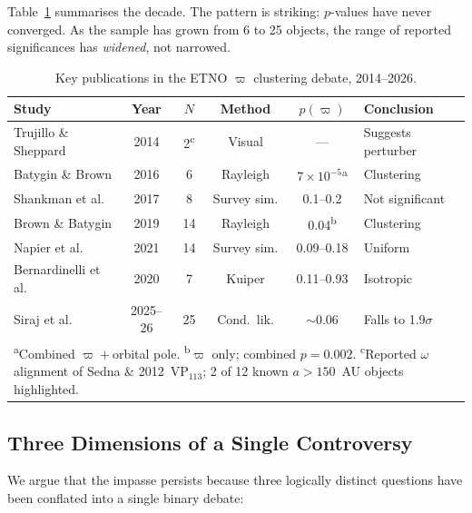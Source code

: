 \documentclass[12pt,a4paper]{article}
\begin{document}
Table~\ref{tab:timeline} summarises the decade. The pattern is striking: $p$-values have never converged. As the sample has grown from 6 to 25 objects, the range of reported significances has \textit{widened}, not narrowed.

\begin{table}[h]
\centering
\caption{Key publications in the ETNO $\varpi$ clustering debate, 2014--2026.}
\label{tab:timeline}
\tiny
\begin{tabular}{p{2.8cm}ccccp{2.8cm}}
\hline
Study & Year & $N$ & Method & $p(\varpi)$ & Conclusion \\
\hline
Trujillo \& Sheppard \cite{trujillo2014} & 2014 & 2\textsuperscript{c} & Visual & --- & Suggests perturber \\
Batygin \& Brown \cite{batygin2016} & 2016 & 6 & Rayleigh & $7{\times}10^{-5}$\textsuperscript{a} & Clustering \\
Shankman et al.\ \cite{shankman2017} & 2017 & 8 & Survey sim. & 0.1--0.2 & Not significant \\
Brown \& Batygin \cite{brown2019} & 2019 & 14 & Rayleigh & 0.04\textsuperscript{b} & Clustering \\
Napier et al.\ \cite{napier2021} & 2021 & 14 & Survey sim. & 0.09--0.18 & Uniform \\
Bernardinelli et al.\ \cite{bernardinelli2020} & 2020 & 7 & Kuiper & 0.11--0.93 & Isotropic \\
Siraj et al.\ \cite{siraj2025,siraj2026} & 2025--26 & 25 & Cond.\ lik. & $\sim$0.06 & Falls to 1.9$\sigma$ \\
\hline
\multicolumn{6}{l}{\tiny\textsuperscript{a}Combined $\varpi{+}$orbital pole. \textsuperscript{b}$\varpi$ only; combined $p{=}0.002$. \textsuperscript{c}Reported $\omega$ alignment of Sedna \& 2012~VP$_{113}$; 2 of 12 known $a{>}150$~AU objects highlighted.} \\
\end{tabular}
\end{table}

\subsection{Three Dimensions of a Single Controversy}

We argue that the impasse persists because three logically distinct questions have been conflated into a single binary debate:
\end{document}
